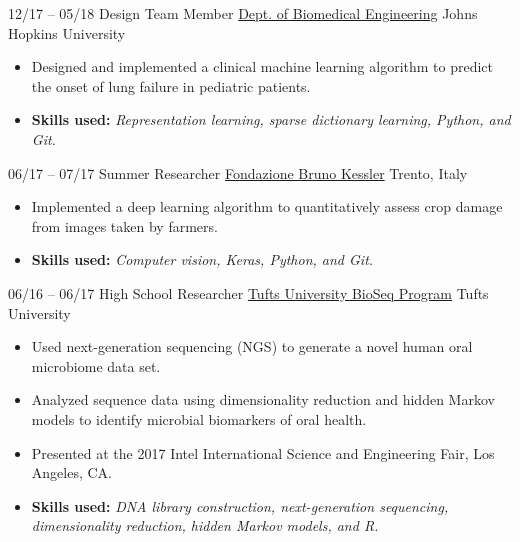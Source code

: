 \cventry
{12/17 -- 05/18}
{Design Team Member}
{\href{https://cbid.bme.jhu.edu/academics/undergraduate-studies/}{Dept. of Biomedical Engineering}}
{Johns Hopkins University}
{}
{
\begin{itemize}
    \item Designed and implemented a clinical machine learning algorithm to predict the onset of lung failure in pediatric patients.
    \item \textbf{Skills used:} \textit{Representation learning, sparse dictionary learning, Python, and Git.}
\end{itemize}{}
}

\cventry
{06/17 -- 07/17}
{Summer Researcher}
{\href{https://webvalley.fbk.eu}{Fondazione Bruno Kessler}}
{Trento, Italy}
{}
{
\begin{itemize}
    \item Implemented a deep learning algorithm to quantitatively assess crop damage from images taken by farmers.
    \item \textbf{Skills used:} \textit{Computer vision, Keras, Python, and Git.}
\end{itemize}{}
}

\cventry
{06/16 -- 06/17}
{High School Researcher}
{\href{http://ase.tufts.edu/chemistry/walt/sepa/index.html}{Tufts University BioSeq Program}}
{Tufts University}
{}
{
\begin{itemize}
    \item Used next-generation sequencing (NGS) to generate a novel human oral microbiome data set.
    \item Analyzed sequence data using dimensionality reduction and hidden Markov models to identify microbial biomarkers of oral health.
    \item Presented at the 2017 Intel International Science and Engineering Fair, Los Angeles, CA.
    \item \textbf{Skills used:} \textit{DNA library construction, next-generation sequencing, dimensionality reduction, hidden Markov models, and R.}
\end{itemize}{}
}